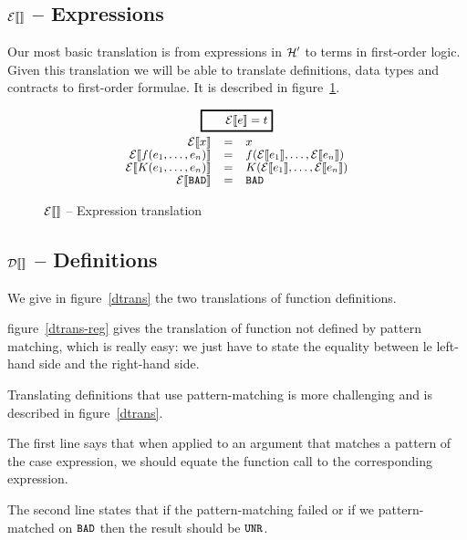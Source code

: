 \documentclass[preprint]{sigplanconf}
\begin{document}
\subsection{$\etrans{}$ -- Expressions}
Our most basic translation is from expressions in $\hprime$ to terms
in first-order logic. Given this translation we will be able to
translate definitions, data types and contracts to first-order
formulae. It is described in figure~\ref{etrans}.

\begin{figure}
$$
\begin{array}{rcl}
\multicolumn{3}{c}{\ruleform{\etrans{e} = t}} \\[2.5mm]
 \etrans{x} &=& x\\
  \etrans{f(e_1,\dots,e_n)} &=& f(\etrans{e_1},\dots,\etrans{e_n})\\
  \etrans{K(e_1,\dots,e_n)} &=& K(\etrans{e_1},\dots,\etrans{e_n})\\
  \etrans{\bad} &=& \bad
\end{array}
$$
\caption{$\etrans{}$ -- Expression translation}
\label{etrans}
\end{figure}

\subsection{$\dtrans{}$ -- Definitions}
We give in figure~\ref{dtrans} the two translations of function
definitions.

figure~\ref{dtrans-reg} gives the translation of function not defined by
pattern matching, which is really easy: we just have to state the
equality between le left-hand side and the right-hand side.

Translating definitions that use pattern-matching is more challenging
and is described in figure~\ref{dtrans}.  

The first line says that when applied to an argument that matches a
pattern of the case expression, we should equate the function call to
the corresponding expression. 

The second line states that if the pattern-matching failed or if we
pattern-matched on $\bad$ then the result should be $\unr$.
\end{document}
